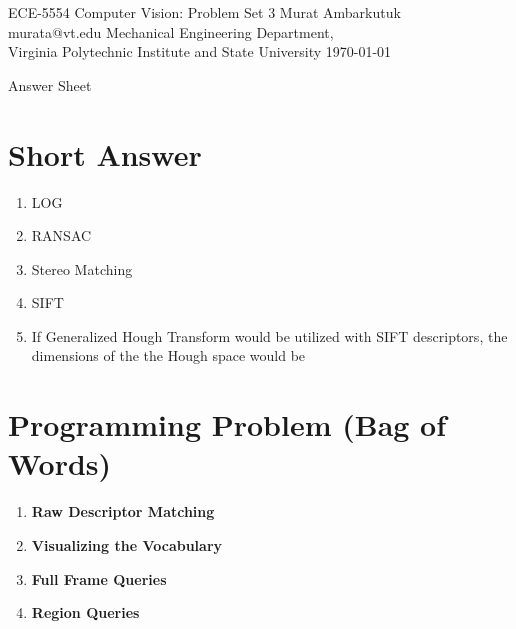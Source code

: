 \documentclass{article}
\begin{document}
\label{Cover}
	\begin{center}
	\large{ECE-5554 Computer Vision: Problem Set 3} 
	\vfill
	Murat Ambarkutuk \\ murata@vt.edu
	\vfill
	Mechanical Engineering Department,\\ Virginia Polytechnic Institute and State University
	\vfill
	\today
	\end{center}
\pagebreak 
\large{Answer Sheet}
\label{Short Answer}
\section{Short Answer}
\begin{enumerate}
	\item LOG
	\item RANSAC 
	\item Stereo Matching
	\item SIFT 
	\item If Generalized Hough Transform would be utilized with SIFT descriptors,
	the dimensions of the the Hough space would be 
\end{enumerate}

\label{Programming Problem (Bag of Words)}
\section{Programming Problem (Bag of Words)}
\begin{enumerate}
	\item \textbf{Raw Descriptor Matching}
	\item \textbf{Visualizing the Vocabulary}
	\item \textbf{Full Frame Queries}
	\item \textbf{Region Queries}
\end{enumerate}
\end{document}
